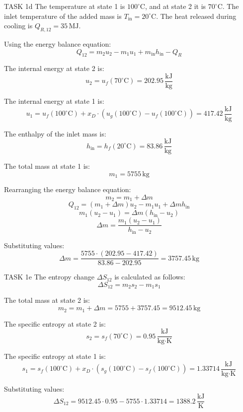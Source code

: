 TASK 1d  
The temperature at state 1 is \( 100^\circ\text{C} \), and at state 2 it is \( 70^\circ\text{C} \). The inlet temperature of the added mass is \( T_{\text{in}} = 20^\circ\text{C} \). The heat released during cooling is \( Q_{R,12} = 35 \, \text{MJ} \).  

Using the energy balance equation:  
\[
Q_{12} = m_2 u_2 - m_1 u_1 + m_{\text{in}} h_{\text{in}} - Q_R
\]  

The internal energy at state 2 is:  
\[
u_2 = u_f(70^\circ\text{C}) = 202.95 \, \frac{\text{kJ}}{\text{kg}}
\]  

The internal energy at state 1 is:  
\[
u_1 = u_f(100^\circ\text{C}) + x_D \cdot (u_g(100^\circ\text{C}) - u_f(100^\circ\text{C})) = 417.42 \, \frac{\text{kJ}}{\text{kg}}
\]  

The enthalpy of the inlet mass is:  
\[
h_{\text{in}} = h_f(20^\circ\text{C}) = 83.86 \, \frac{\text{kJ}}{\text{kg}}
\]  

The total mass at state 1 is:  
\[
m_1 = 5755 \, \text{kg}
\]  

Rearranging the energy balance equation:  
\[
m_2 = m_1 + \Delta m
\]  
\[
Q_{12} = (m_1 + \Delta m) u_2 - m_1 u_1 + \Delta m h_{\text{in}}
\]  
\[
m_1 (u_2 - u_1) = \Delta m (h_{\text{in}} - u_2)
\]  
\[
\Delta m = \frac{m_1 (u_2 - u_1)}{h_{\text{in}} - u_2}
\]  

Substituting values:  
\[
\Delta m = \frac{5755 \cdot (202.95 - 417.42)}{83.86 - 202.95} = 3757.45 \, \text{kg}
\]  

TASK 1e  
The entropy change \( \Delta S_{12} \) is calculated as follows:  
\[
\Delta S_{12} = m_2 s_2 - m_1 s_1
\]  

The total mass at state 2 is:  
\[
m_2 = m_1 + \Delta m = 5755 + 3757.45 = 9512.45 \, \text{kg}
\]  

The specific entropy at state 2 is:  
\[
s_2 = s_f(70^\circ\text{C}) = 0.95 \, \frac{\text{kJ}}{\text{kg·K}}
\]  

The specific entropy at state 1 is:  
\[
s_1 = s_f(100^\circ\text{C}) + x_D \cdot (s_g(100^\circ\text{C}) - s_f(100^\circ\text{C})) = 1.33714 \, \frac{\text{kJ}}{\text{kg·K}}
\]  

Substituting values:  
\[
\Delta S_{12} = 9512.45 \cdot 0.95 - 5755 \cdot 1.33714 = 1388.2 \, \frac{\text{kJ}}{\text{K}}
\]